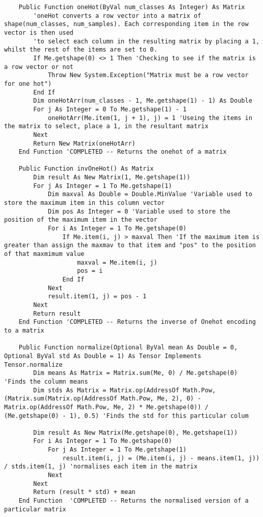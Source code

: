 \begin{verbatim}
    Public Function oneHot(ByVal num_classes As Integer) As Matrix
        'oneHot converts a row vector into a matrix of shape(num_classes, num_samples). Each corresponding item in the row vector is then used
        'to select each column in the resulting matrix by placing a 1, whilst the rest of the items are set to 0.
        If Me.getshape(0) <> 1 Then 'Checking to see if the matrix is a row vector or not
            Throw New System.Exception("Matrix must be a row vector for one hot")
        End If
        Dim oneHotArr(num_classes - 1, Me.getshape(1) - 1) As Double
        For j As Integer = 0 To Me.getshape(1) - 1
            oneHotArr(Me.item(1, j + 1), j) = 1 'Useing the items in the matrix to select, place a 1, in the resultant matrix
        Next
        Return New Matrix(oneHotArr)
    End Function 'COMPLETED -- Returns the onehot of a matrix

    Public Function invOneHot() As Matrix
        Dim result As New Matrix(1, Me.getshape(1))
        For j As Integer = 1 To Me.getshape(1)
            Dim maxval As Double = Double.MinValue 'Variable used to store the maximum item in this column vector
            Dim pos As Integer = 0 'Variable used to store the position of the maximum item in the vector
            For i As Integer = 1 To Me.getshape(0)
                If Me.item(i, j) > maxval Then 'If the maximum item is greater than assign the maxmav to that item and "pos" to the position of that maxmimum value
                    maxval = Me.item(i, j)
                    pos = i
                End If
            Next
            result.item(1, j) = pos - 1
        Next
        Return result
    End Function 'COMPLETED -- Returns the inverse of Onehot encoding to a matrix

    Public Function normalize(Optional ByVal mean As Double = 0, Optional ByVal std As Double = 1) As Tensor Implements Tensor.normalize
        Dim means As Matrix = Matrix.sum(Me, 0) / Me.getshape(0) 'Finds the column means
        Dim stds As Matrix = Matrix.op(AddressOf Math.Pow, (Matrix.sum(Matrix.op(AddressOf Math.Pow, Me, 2), 0) - Matrix.op(AddressOf Math.Pow, Me, 2) * Me.getshape(0)) / (Me.getshape(0) - 1), 0.5) 'Finds the std for this particular colum

        Dim result As New Matrix(Me.getshape(0), Me.getshape(1))
        For i As Integer = 1 To Me.getshape(0)
            For j As Integer = 1 To Me.getshape(1)
                result.item(i, j) = (Me.item(i, j) - means.item(1, j)) / stds.item(1, j) 'normalises each item in the matrix
            Next
        Next
        Return (result * std) + mean
    End Function  'COMPLETED -- Returns the normalised version of a particular matrix


\end{verbatim}
